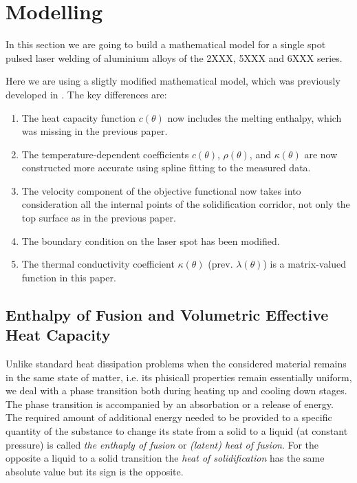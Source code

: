 \section{Modelling}
\label{sec:modelling}

In this section we are going to build a mathematical model for a single spot pulsed laser welding of aluminium alloys of the 2XXX, 5XXX and 6XXX series.

{\color{TolHighContrastBlue}
Here we are using a sligtly modified mathematical model, which was previously developed in \cite{BergmannBieleninHerzogHildebrandRiedelSchrickerTrunkWorthmann:2017:1}.
The key differences are:
\begin{enumerate}
	\item The heat capacity function $c(\theta)$ now includes the melting enthalpy, which was missing in the previous paper.
	\item The temperature-dependent coefficients $c(\theta)$, $\rho(\theta)$, and $\kappa(\theta)$ are now constructed more accurate using spline fitting to the measured data.
	\item The velocity component of the objective functional now takes into consideration all the internal points of the solidification corridor, not only the top surface as in the previous paper.
	\item The boundary condition on the laser spot has been modified.
	\item The thermal conductivity coefficient $\kappa(\theta)$ (prev. $\lambda(\theta)$) is a matrix-valued function in this paper.
\end{enumerate}
}


\subsection{Enthalpy of Fusion and Volumetric Effective Heat Capacity}
\label{subsec:capacity}

Unlike standard heat dissipation problems when the considered material remains in the same state of matter, i.e. its phisicall properties remain essentially uniform, we deal with a phase transition both during heating up and cooling down stages. The phase transition is accompanied by an absorbation or a release of energy. The required amount of additional energy needed to be provided to a specific quantity of the substance to change its state from a solid to a liquid (at constant pressure) is called \emph{the enthaply of fusion} or \emph{(latent) heat of fusion}. For the opposite a liquid to a solid transition the \emph{heat of solidification} has the same absolute value but its sign is the opposite.

